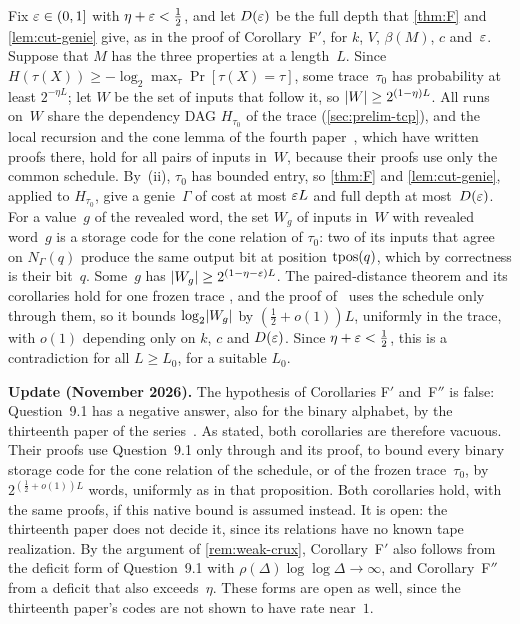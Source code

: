 \begin{informalproof}
Fix $\varepsilon\in(0,1]$ with $\eta+\varepsilon<\frac12$, and let $D(\varepsilon)$ be the full depth that \cref{thm:F} and
\cref{lem:cut-genie} give, as in the proof of Corollary~F$'$, for $k$, $V$, $\beta(M)$, $c$ and~$\varepsilon$. Suppose that $M$ has the
three properties at a length~$L$. Since $H(\tau(X))\ge-\log_2\max_\tau\Pr[\tau(X)=\tau]$, some trace~$\tau_0$ has
probability at least $2^{-\eta L}$; let $W$ be the set of inputs that follow it, so $\lvert W \rvert\ge2^{(1-\eta)L}$. All runs on~$W$
share the dependency DAG $H_{\tau_0}$ of the trace (\cref{sec:prelim-tcp}), and the local recursion and the cone lemma of the
fourth paper~\cite[Lemma~4.2, Lemma~4.4 and Corollary~4.5]{FourthPaper2026}, which have written proofs there, hold for all
pairs of inputs in~$W$, because their proofs use only the common schedule. By~(ii), $\tau_0$ has bounded entry, so
\cref{thm:F} and \cref{lem:cut-genie}, applied to $H_{\tau_0}$, give a genie~$\Gamma$ of cost at most $\varepsilon L$ and full depth
at most~$D(\varepsilon)$. For a value~$g$ of the revealed word,
the set $W_g$ of inputs in~$W$ with revealed word~$g$ is a storage code for the cone relation of $\tau_0$: two of its inputs that
agree on $N_\Gamma(q)$ produce the same output bit at position $\operatorname{tpos}(q)$, which by correctness is their bit~$q$. Some~$g$ has
$\lvert W_g \rvert\ge2^{(1-\eta-\varepsilon)L}$. The paired-distance theorem and its corollaries hold for one frozen trace
\cite[Remark~3.9]{DirectedRecovery2026}, and the proof of~\cite[Proposition~9.2]{DirectedRecovery2026} uses the schedule only
through them, so it bounds $\log_2\lvert W_g \rvert$ by $(\frac12+o(1))L$, uniformly in the trace, with $o(1)$ depending only on
$k$, $c$ and $D(\varepsilon)$. Since $\eta+\varepsilon<\frac12$, this is a contradiction for all $L\ge L_0$, for a suitable $L_0$.
\end{informalproof}

\textbf{Update (November 2026).} The hypothesis of Corollaries F$'$ and~F$''$ is false: Question~9.1 has a negative answer,
also for the binary alphabet, by the thirteenth paper of the series~\cite[Theorem~A and Corollary~A$'$]{StorageCodes2026}.
As stated, both corollaries are therefore vacuous. Their proofs use Question~9.1 only through
\cite[Proposition~9.2]{DirectedRecovery2026} and its proof, to bound every binary storage code for the cone relation of
the schedule, or of the frozen trace~$\tau_0$, by $2^{(\frac12+o(1))L}$ words, uniformly as in that proposition. Both
corollaries hold, with the same proofs, if this native bound is assumed instead. It is open: the thirteenth paper does not
decide it, since its relations have no known tape realization. By the argument of \cref{rem:weak-crux}, Corollary~F$'$ also
follows from the deficit form of Question~9.1 with $\rho(\Delta)\log\log\Delta\to\infty$, and Corollary~F$''$ from a deficit
that also exceeds~$\eta$. These forms are open as well, since the thirteenth paper's codes are not shown to have rate
near~$1$.

